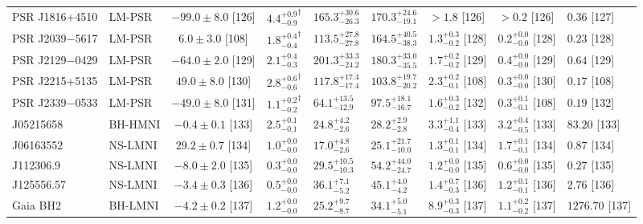 \begin{table*}
\begin{adjustbox}{width=0.98\textwidth}
\begin{threeparttable}
\begin{tabular}{llcllllll}
      PSR J1816+4510       & LM-PSR   & $ -99.0\pm  8.0$ [126] & ${4.4^{+0.9}_{-0.9}}^\dag$  & $165.3^{+30.6}_{-26.3}$   & $170.3^{+24.6}_{-19.1}$   & $>1.8$ [126]              & $>0.2$ [126]                 & $0.36$ [127] \\
      PSR J2039$-$5617     & LM-PSR   & $   6.0\pm  3.0$ [108] & ${1.8^{+0.4}_{-0.4}}^\dag$  & $113.5^{+27.8}_{-27.8}$   & $164.5^{+40.5}_{-38.3}$   & $1.3^{+0.3}_{-0.2}$ [128] & $0.2^{+0.0}_{-0.0}$ [128]    & $0.23$ [128] \\
      PSR J2129$-$0429     & LM-PSR   & $ -64.0\pm  2.0$ [129] & $2.1^{+0.4}_{-0.3}$         & $201.3^{+33.3}_{-24.2}$   & $180.3^{+33.0}_{-35.5}$   & $1.7^{+0.2}_{-0.2}$ [129] & $0.4^{+0.0}_{-0.0}$ [129]    & $0.64$ [129] \\
      PSR J2215+5135       & LM-PSR   & $  49.0\pm  8.0$ [130] & ${2.8^{+0.6}_{-0.6}}^\dag$  & $117.8^{+17.4}_{-17.4}$   & $103.8^{+19.7}_{-20.2}$   & $2.3^{+0.2}_{-0.1}$ [108] & $0.3^{+0.0}_{-0.0}$ [130]    & $0.17$ [108] \\
      PSR J2339$-$0533     & LM-PSR   & $ -49.0\pm  8.0$ [131] & ${1.1^{+0.2}_{-0.2}}^\dag$  & $64.1^{+13.5}_{-12.9}$    & $97.5^{+18.1}_{-16.7}$    & $1.6^{+0.3}_{-0.2}$ [132] & $0.3^{+0.1}_{-0.1}$ [108]    & $0.19$ [132] \\
      J05215658            & BH-HMNI  & $  -0.4\pm  0.1$ [133] & $2.5^{+0.1}_{-0.1}$         & $24.8^{+4.2}_{-2.6}$      & $28.2^{+2.9}_{-2.8}$      & $3.3^{+1.1}_{-0.4}$ [133] & $3.2^{+0.4}_{-0.5}$ [133]    & $83.20$ [133] \\
      J06163552            & NS-LMNI  & $  29.2\pm  0.7$ [134] & $1.0^{+0.0}_{-0.0}$         & $17.0^{+4.8}_{-2.6}$      & $25.1^{+21.7}_{-10.0}$    & $1.3^{+0.1}_{-0.1}$ [134] & $1.7^{+0.1}_{-0.1}$ [134]    & $0.87$ [134] \\
      J112306.9            & NS-LMNI  & $  -8.0\pm  2.0$ [135] & $0.3^{+0.0}_{-0.0}$         & $29.5^{+10.5}_{-10.3}$    & $54.2^{+44.0}_{-24.7}$    & $1.2^{+0.0}_{-0.0}$ [135] & $0.6^{+0.0}_{-0.0}$ [135]    & $0.27$ [135] \\
      J125556.57           & NS-LMNI  & $  -3.4\pm  0.3$ [136] & $0.5^{+0.0}_{-0.0}$         & $36.1^{+7.1}_{-5.2}$      & $45.1^{+4.0}_{-4.2}$      & $1.4^{+0.7}_{-0.3}$ [136] & $1.2^{+0.1}_{-0.1}$ [136]    & $2.76$ [136] \\
      Gaia BH2             & BH-LMNI  & $  -4.2\pm  0.2$ [137] & $1.2^{+0.0}_{-0.0}$         & $25.2^{+9.7}_{-8.7}$      & $34.1^{+5.0}_{-5.1}$      & $8.9^{+0.3}_{-0.3}$ [137] & $1.1^{+0.2}_{-0.2}$ [137]    & $1276.70$ [137] \\

\end{tabular}
\end{threeparttable}
\end{adjustbox}
\end{table*}

